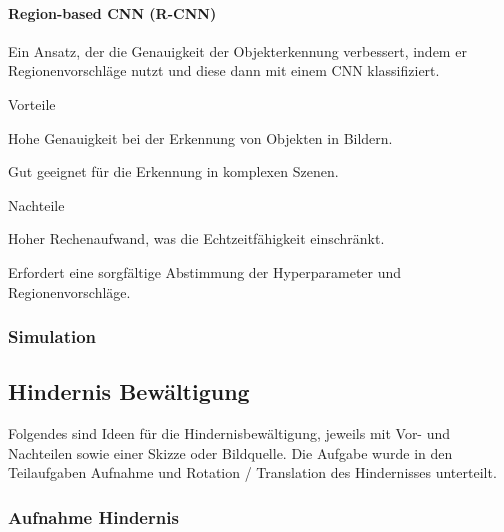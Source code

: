 \paragraph{Region-based CNN (R-CNN)}

Ein Ansatz, der die Genauigkeit der Objekterkennung verbessert, indem er Regionenvorschläge nutzt und diese dann mit einem CNN klassifiziert.

\begin{minipage}[t]{0.48\textwidth}
    \begin{items}
      \item [Vorteile]
      \item Hohe Genauigkeit bei der Erkennung von Objekten in Bildern.
      \item Gut geeignet für die Erkennung in komplexen Szenen.
    \end{items}
\end{minipage}
\hfill
\begin{minipage}[t]{0.48\textwidth}
    \begin{items}
      \item [Nachteile]
      \item Hoher Rechenaufwand, was die Echtzeitfähigkeit einschränkt.
      \item Erfordert eine sorgfältige Abstimmung der Hyperparameter und Regionenvorschläge.
    \end{items}
\end{minipage}



\subsubsection{Simulation}


\newpage
\subsection{Hindernis Bewältigung}
Folgendes sind Ideen für die Hindernisbewältigung, jeweils mit Vor- und Nachteilen sowie einer Skizze oder Bildquelle. Die Aufgabe wurde in den Teilaufgaben Aufnahme und Rotation / Translation des Hindernisses unterteilt. 

\subsubsection{Aufnahme Hindernis}

